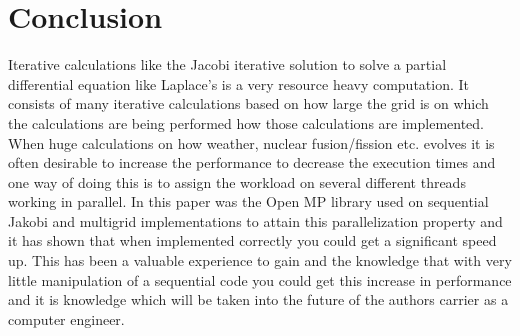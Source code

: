 \documentclass{article}
\begin{document}
\section{Conclusion}\label{conclusion}

Iterative calculations like the Jacobi iterative solution to solve a partial differential equation like Laplace’s is a very resource heavy computation. It consists of many iterative calculations based on how large the grid is on which the calculations are being performed how those calculations are implemented. When huge calculations on how weather, nuclear fusion/fission etc. evolves it is often desirable to increase the performance to decrease the execution times and one way of doing this is to assign the workload on several different threads working in parallel. In this paper was the Open MP library used on sequential Jakobi and multigrid implementations to attain this parallelization property and it has shown that when implemented correctly you could get a significant speed up. This has been a valuable experience to gain and the knowledge that with very little manipulation of a sequential code you could get this increase in performance and it is knowledge which will be taken into the future of the authors carrier as a computer engineer. 
\end{document}
